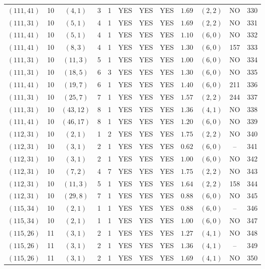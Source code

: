 \begin{longtable}{|c|c|c|c|c|c|c|c|c|c|c|c|}
$(111,41)$ & 10 & $(4,1)$ & 3 & 1 & YES & YES & YES & $1.69$ & $(2,2)$ & NO & 330\\
$(111,31)$ & 10 & $(5,1)$ & 4 & 1 & YES & YES & YES & $1.69$ & $(2,2)$ & NO & 331\\
$(111,41)$ & 10 & $(5,1)$ & 4 & 1 & YES & YES & YES & $1.10$ & $(6,0)$ & NO & 332\\
$(111,41)$ & 10 & $(8,3)$ & 4 & 1 & YES & YES & YES & $1.30$ & $(6,0)$ & 157 & 333\\
$(111,31)$ & 10 & $(11,3)$ & 5 & 1 & YES & YES & YES & $1.00$ & $(6,0)$ & NO & 334\\
$(111,31)$ & 10 & $(18,5)$ & 6 & 3 & YES & YES & YES & $1.30$ & $(6,0)$ & NO & 335\\
$(111,41)$ & 10 & $(19,7)$ & 6 & 1 & YES & YES & YES & $1.40$ & $(6,0)$ & 211 & 336\\
$(111,31)$ & 10 & $(25,7)$ & 7 & 1 & YES & YES & YES & $1.57$ & $(2,2)$ & 244 & 337\\
$(111,31)$ & 10 & $(43,12)$ & 8 & 1 & YES & YES & YES & $1.36$ & $(4,1)$ & NO & 338\\
$(111,41)$ & 10 & $(46,17)$ & 8 & 1 & YES & YES & YES & $1.20$ & $(6,0)$ & NO & 339\\
$(112,31)$ & 10 & $(2,1)$ & 1 & 2 & YES & YES & YES & $1.75$ & $(2,2)$ & NO & 340\\
$(112,31)$ & 10 & $(3,1)$ & 2 & 1 & YES & YES & YES & $0.62$ & $(6,0)$ & -- & 341\\
$(112,31)$ & 10 & $(3,1)$ & 2 & 1 & YES & YES & YES & $1.00$ & $(6,0)$ & NO & 342\\
$(112,31)$ & 10 & $(7,2)$ & 4 & 7 & YES & YES & YES & $1.75$ & $(2,2)$ & NO & 343\\
$(112,31)$ & 10 & $(11,3)$ & 5 & 1 & YES & YES & YES & $1.64$ & $(2,2)$ & 158 & 344\\
$(112,31)$ & 10 & $(29,8)$ & 7 & 1 & YES & YES & YES & $0.88$ & $(6,0)$ & NO & 345\\
$(115,34)$ & 10 & $(2,1)$ & 1 & 1 & YES & YES & YES & $0.88$ & $(6,0)$ & -- & 346\\
$(115,34)$ & 10 & $(2,1)$ & 1 & 1 & YES & YES & YES & $1.00$ & $(6,0)$ & NO & 347\\
$(115,26)$ & 11 & $(3,1)$ & 2 & 1 & YES & YES & YES & $1.27$ & $(4,1)$ & NO & 348\\
$(115,26)$ & 11 & $(3,1)$ & 2 & 1 & YES & YES & YES & $1.36$ & $(4,1)$ & -- & 349\\
$(115,26)$ & 11 & $(3,1)$ & 2 & 1 & YES & YES & YES & $1.69$ & $(4,1)$ & NO & 350\\

\end{longtable}
